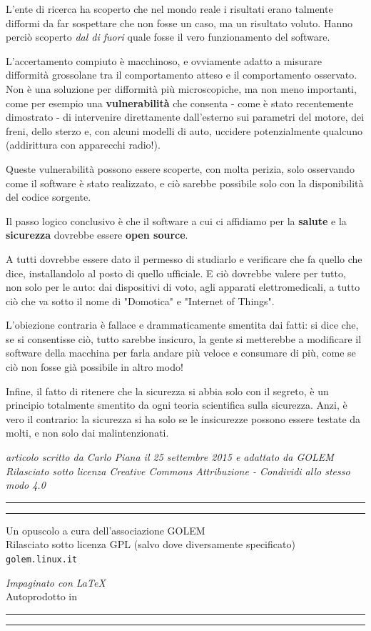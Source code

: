\documentclass[a4paper, 12pt]{extarticle}
\newcommand*{\footerAT}{\begingroup %

\newlength{\footdrop} %
\footdrop=0.1\textheight %

\rule{\textwidth}{1pt}\par %
\vspace{2pt}\vspace{-\baselineskip} %
\rule{\textwidth}{0.4pt}\par %

\vfill %
\centering{}

Un opuscolo a cura dell'associazione GOLEM\\
Rilasciato sotto licenza GPL (salvo dove diversamente specificato)\\
\texttt{golem.linux.it}

\textit{Impaginato con \LaTeX}
\\
Autoprodotto in \textit{\monthname{} \the\year}
\vspace*{\footdrop} %

\rule{\textwidth}{0.4pt}\par %
\vspace{2pt}\vspace{-\baselineskip} %
\rule{\textwidth}{1pt}\par %

\endgroup}
\begin{document}
L'ente di ricerca ha scoperto che nel mondo reale i risultati erano
talmente difformi da far sospettare che non fosse un caso, ma un
risultato voluto. Hanno perciò scoperto \textit{dal di fuori} quale
fosse il vero funzionamento del software.

L'accertamento compiuto è macchinoso, e ovviamente adatto a misurare
difformità grossolane tra il comportamento atteso e il comportamento
osservato. Non è una soluzione per difformità più microscopiche, ma non
meno importanti, come per esempio una \textbf{vulnerabilità} che
consenta - come è stato recentemente dimostrato - di intervenire
direttamente dall'esterno sui parametri del motore, dei freni, dello
sterzo e, con alcuni modelli di auto, uccidere potenzialmente qualcuno
(addirittura con apparecchi radio!).

Queste vulnerabilità possono essere scoperte, con molta perizia, solo
osservando come il software è stato realizzato, e ciò sarebbe possibile
solo con la disponibilità del codice sorgente.

Il passo logico conclusivo è che il software a cui ci affidiamo per la
\textbf{salute} e la \textbf{sicurezza} dovrebbe essere \textbf{open
source}.

A tutti dovrebbe essere dato il permesso di studiarlo e verificare che
fa quello che dice, installandolo al posto di quello ufficiale. E ciò
dovrebbe valere per tutto, non solo per le auto: dai dispositivi di
voto, agli apparati elettromedicali, a tutto ciò che va sotto il nome
di "Domotica" e "Internet of Things".

L'obiezione contraria è fallace e drammaticamente smentita dai fatti:
si dice che, se si consentisse ciò, tutto sarebbe insicuro, la gente si
metterebbe a modificare il software della macchina per farla andare più
veloce e consumare di più, come se ciò non fosse già possibile in altro
modo!

Infine, il fatto di ritenere che la sicurezza si abbia
solo con il segreto, è un principio totalmente smentito da ogni teoria
scientifica sulla sicurezza. Anzi, è vero il contrario: la sicurezza si
ha solo se le insicurezze possono essere testate da molti, e non solo
dai malintenzionati.

\begin{center}
\textit{articolo scritto da Carlo Piana il 25 settembre 2015 e adattato da GOLEM\\
Rilasciato sotto licenza Creative Commons Attribuzione - Condividi allo stesso modo 4.0}
\end{center}

\clearpage
\thispagestyle{empty}
\mbox{}
\clearpage

\footerAT
\end{document}
